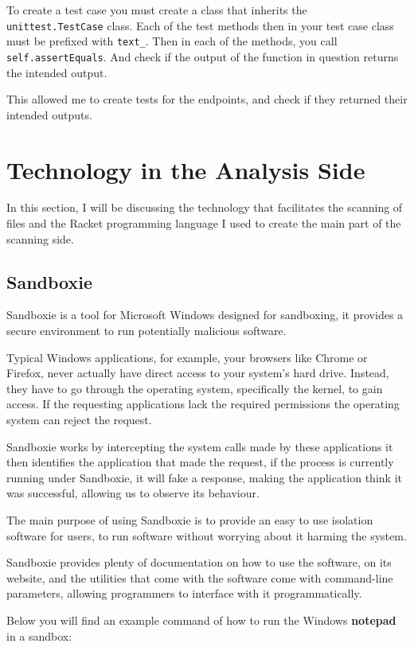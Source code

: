 To create a test case you must create a class that inherits the
\texttt{unittest.TestCase} class.
Each of the test methods then in your test case class must be prefixed
with \texttt{text\_}.
Then in each of the methods, you call \texttt{self.assertEquals}.
And check if the output of the function in question returns
the intended output.

This allowed me to create tests for the endpoints,
and check if they returned their intended outputs.

\section{Technology in the Analysis Side}
In this section, I will be discussing the technology that
facilitates the scanning of files and the Racket programming language
I used to create the main part of the scanning side.

\subsection{Sandboxie}
Sandboxie is a tool for Microsoft Windows designed for sandboxing,
it provides a secure environment to run potentially malicious software.

Typical Windows applications, for example, your browsers like Chrome or Firefox,
never actually have direct access to your system's hard drive.
Instead, they have to go through the operating system, specifically the kernel,
to gain access. If the requesting applications lack the required permissions
the operating system can reject the request.

Sandboxie works by intercepting the system calls made by these applications
it then identifies the application that made the request,
if the process is currently running under Sandboxie,
it will fake a response, making the application think it was successful,
allowing us to observe its behaviour.

The main purpose of using Sandboxie is to provide an
easy to use isolation software for users, to run software
without worrying about it harming the system.

Sandboxie provides plenty of documentation on how to use the software, on its website,
and the utilities that come with the software come with command-line parameters,
allowing programmers to interface with it programmatically.

Below you will find an example command of how to run the Windows
\textbf{notepad} in a sandbox:


